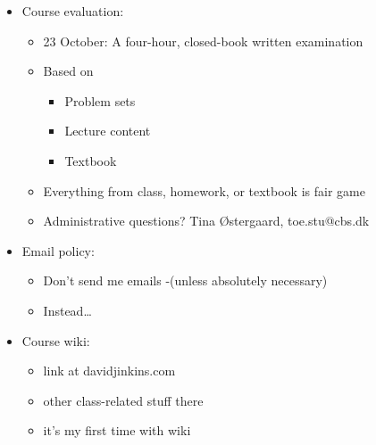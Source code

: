 \documentclass[ignorenonframetext,]{beamer}
\begin{document}
\begin{frame}

\begin{itemize}
\itemsep1pt\parskip0pt
\item
  Course evaluation:

  \begin{itemize}
  \itemsep1pt\parskip0pt
  \item
    23 October: A four-hour, closed-book written examination
  \item
    Based on

    \begin{itemize}
    \itemsep1pt\parskip0pt
    \item
      Problem sets
    \item
      Lecture content
    \item
      Textbook
    \end{itemize}
  \item
    Everything from class, homework, or textbook is fair game
  \item
    Administrative questions? Tina Østergaard, toe.stu@cbs.dk
  \end{itemize}
\end{itemize}

\end{frame}

\begin{frame}

\begin{itemize}
\itemsep1pt\parskip0pt
\item
  Email policy:

  \begin{itemize}
  \itemsep1pt\parskip0pt
  \item
    Don't send me emails -(unless absolutely necessary)
  \item
    Instead\ldots
  \end{itemize}
\end{itemize}

\end{frame}

\begin{frame}

\begin{itemize}
\itemsep1pt\parskip0pt
\item
  Course wiki:

  \begin{itemize}
  \itemsep1pt\parskip0pt
  \item
    link at davidjinkins.com
  \item
    other class-related stuff there
  \item
    it's my first time with wiki
  \end{itemize}
\end{itemize}

\end{frame}
\end{document}
